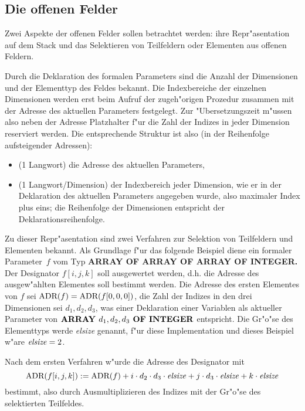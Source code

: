 \subsection{Die offenen Felder}
\label{offene Felder}

Zwei Aspekte der offenen Felder sollen betrachtet werden: ihre Repr"asentation
auf dem Stack und das Selektieren von Teilfeldern oder Elementen aus
offenen Feldern.

\medskip
Durch die Deklaration des formalen Parameters sind die Anzahl der Dimensionen
und der Elementtyp des Feldes bekannt.
Die Indexbereiche der einzelnen Dimensionen werden erst beim Aufruf der
zugeh"origen Prozedur zusammen mit der Adresse des aktuellen Parameters festgelegt.
Zur "Ubersetzungszeit m"ussen also neben der Adresse Platzhalter f"ur die
Zahl der Indizes in jeder Dimension reserviert werden.
Die entsprechende Struktur ist also (in der Reihenfolge aufsteigender Adressen):
\begin{itemize}
\item (1 Langwort) die Adresse des aktuellen Parameters,
\item (1 Langwort/Dimension) der Indexbereich jeder Dimension, wie er in
  der Deklaration des aktuellen Parameters angegeben wurde, also
  maximaler Index plus eins;
  die Reihenfolge der Dimensionen entspricht der Deklarationsreihenfolge.
\end{itemize}

Zu dieser Repr"asentation sind zwei Verfahren zur Selektion von Teilfeldern
und Elementen bekannt.
Als Grundlage f"ur das folgende Beispiel diene ein formaler Parameter~$f$
vom Typ {\bf ARRAY OF ARRAY OF ARRAY OF INTEGER.}
Der Designator $f[i, j, k]$ soll ausgewertet werden, d.h. die Adresse
des ausgew"ahlten Elementes soll bestimmt werden.
Die Adresse des ersten Elementes von $f$ sei $\hbox{ADR}(f)=\hbox{ADR}(f[0,0,0])$,
die Zahl der Indizes in den drei Dimensionen sei $d_1, d_2, d_3$, was einer
Deklaration einer Variablen als aktueller Parameter von
$\hbox{\bf ARRAY } d_1, d_2, d_3 \hbox{\bf\ OF INTEGER}$ entspricht.
Die Gr"o"se des Elementtyps werde \hbox{\it elsize\/} genannt, f"ur diese
Implementation und dieses Beispiel w"are $\hbox{\it elsize\/} = 2$.

Nach dem ersten Verfahren w"urde die Adresse des Designator mit
\[   \hbox{ADR}(f[i, j, k]) :=
    \hbox{ADR}(f) + i\cdot d_2\cdot d_3\cdot \hbox{\it elsize\/} + j\cdot d_3\cdot \hbox{\it elsize\/} +
     k\cdot \hbox{\it elsize\/}
\]
bestimmt, also durch Ausmultiplizieren des Indizes mit der Gr"o"se des
selektierten Teilfeldes.


